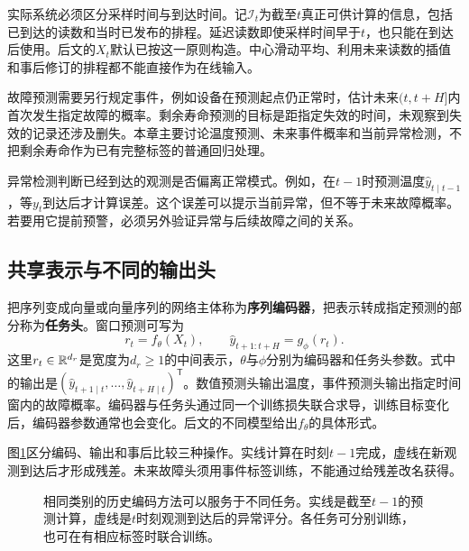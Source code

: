实际系统必须区分采样时间与到达时间。记$\mathcal I_t$为截至$t$真正可供计算的信息，包括已到达的读数和当时已发布的排程。延迟读数即使采样时间早于$t$，也只能在到达后使用。后文的$X_t$默认已按这一原则构造。中心滑动平均、利用未来读数的插值和事后修订的排程都不能直接作为在线输入。

故障预测需要另行规定事件，例如设备在预测起点仍正常时，估计未来$(t,t+H]$内首次发生指定故障的概率。剩余寿命预测的目标是距指定失效的时间，未观察到失效的记录还涉及删失。本章主要讨论温度预测、未来事件概率和当前异常检测，不把剩余寿命作为已有完整标签的普通回归处理。

异常检测判断已经到达的观测是否偏离正常模式。例如，在$t-1$时预测温度$\hat y_{t\mid t-1}$，等$y_t$到达后才计算误差。这个误差可以提示当前异常，但不等于未来故障概率。若要用它提前预警，必须另外验证异常与后续故障之间的关系。

\subsection{共享表示与不同的输出头}
把序列变成向量或向量序列的网络主体称为\textbf{序列编码器}，把表示转成指定预测的部分称为\textbf{任务头}。窗口预测可写为
\begin{equation}
 r_t=f_\theta(X_t),\qquad \hat y_{t+1:t+H}=g_\phi(r_t).
 \label{eq:sequence-encoder-head}
\end{equation}
这里$r_t\in\mathbb{R}^{d_r}$是宽度为$d_r\geq1$的中间表示，$\theta$与$\phi$分别为编码器和任务头参数。式中的输出是$(\hat y_{t+1\mid t},\ldots,\hat y_{t+H\mid t})^{\mathsf T}$。数值预测头输出温度，事件预测头输出指定时间窗内的故障概率。编码器与任务头通过同一个训练损失联合求导，训练目标变化后，编码器参数通常也会变化。后文的不同模型给出$f_\theta$的具体形式。

图\ref{fig:sequence-tasks}区分编码、输出和事后比较三种操作。实线计算在时刻$t-1$完成，虚线在新观测到达后才形成残差。未来故障头须用事件标签训练，不能通过给残差改名获得。
\begin{figure}[htbp]
\centering
{}
\caption{相同类别的历史编码方法可以服务于不同任务。实线是截至$t-1$的预测计算，虚线是$t$时刻观测到达后的异常评分。各任务可分别训练，也可在有相应标签时联合训练。}
\label{fig:sequence-tasks}
\end{figure}

